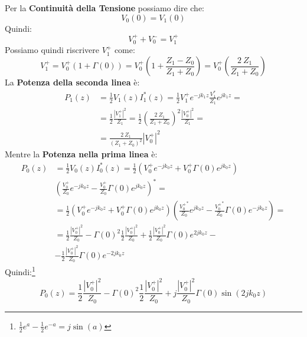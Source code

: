 Per la \textbf{Continuità della Tensione} possiamo dire che:
\begin{equation*}
    V_0(0) = V_1(0)
\end{equation*}
Quindi:
\begin{equation*}
    V_0^+ + V_0^- = V_1^+
\end{equation*}
Possiamo quindi riscrivere $V_1^+$ come:
\begin{equation*}
    V_1^+ = V_0^+ (1 + \Gamma(0)) =  V_0^+ \left(1 + \frac{Z_1 - Z_0}{Z_1 + Z_0} \right) =V_0^+   \left(\frac{2 \ Z_1 }{Z_1 + Z_0} \right)
\end{equation*}
La \textbf{Potenza della seconda linea} è:
\begin{equation*}
\begin{aligned}
       P_1(z) &= \frac{1}{2} V_1(z) I_1^*(z) =  \frac{1}{2} V_1^+ e^{-jk_1z} \frac{V_1^*}{Z_1} e^{jk_1z} =\\
       &=\frac{1}{2} \frac{|V_1^+|^2}{Z_1} = \frac{1}{2} {\left(\frac{2 \ Z_1 }{Z_1 + Z_0} \right)}^2 \frac{|V_0^+|^2}{Z_1} = \\
       &= \frac{2 \ Z_1 }{{(Z_1 + Z_0)}^2}|V_0^+|^2
\end{aligned}
\end{equation*}
Mentre la \textbf{Potenza nella prima linea} è:
\begin{equation*}
\begin{aligned}
       P_0(z) &= \frac{1}{2} V_0(z) I_0^*(z) =  \frac{1}{2}\left(V_0^+ e^{-jk_0z} + V_0^+ \Gamma(0) e^{jk_0z}\right)\\ &{\left(\frac{V_0^+}{Z_0} e^{-jk_0z} - \frac{V_0^+}{Z_0} \Gamma(0) e^{jk_0z}\right)}^* =\\
       &=\frac{1}{2}\left(V_0^+ e^{-jk_0z} + V_0^+ \Gamma(0) e^{jk_0z}\right) \left(\frac{{V_0^+}^*}{Z_0} e^{jk_0z} - \frac{{V_0^+}^*}{Z_0} \Gamma(0) e^{-jk_0z}\right) = \\
       &= \frac{1}{2} \frac{|V_0^+|^2}{Z_0} - {\Gamma(0)}^2 \frac{1}{2} \frac{|V_0^+|^2}{Z_0} + \frac{1}{2} \frac{|V_0^+|^2}{Z_0} \Gamma(0) e^{2jk_0z} - \\
       &- \frac{1}{2} \frac{|V_0^+|^2}{Z_0} \Gamma(0) e^{-2jk_0z}
\end{aligned}
\end{equation*}
Quindi:\footnote{$\frac{1}{2} e^a - \frac{1}{2} e^{-a} = j \sin(a)$}
\begin{equation*}
    P_0(z) = \frac{1}{2} \frac{|V_0^+|^2}{Z_0} - {\Gamma(0)}^2 \frac{1}{2} \frac{|V_0^+|^2}{Z_0} + j \frac{|V_0^+|^2}{Z_0} \Gamma(0) \sin(2jk_0z)
\end{equation*}

